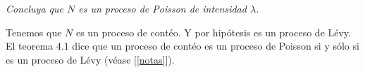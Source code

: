 \emph{
	Concluya que $N$ es un proceso de Poisson de intensidad $\lambda$. 
}

\afterstatement\pn

Tenemos que $N$ es un proceso de contéo. Y por hipótesis es un proceso de Lévy.
El teorema $4.1$ dice que un proceso de contéo es un proceso de Poisson si y sólo si es
un proceso de Lévy (véase [\ref{notas}]).